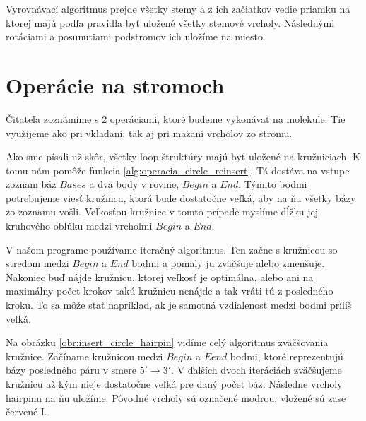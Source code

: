 Vyrovnávací algoritmus prejde všetky stemy a z ich začiatkov vedie priamku na ktorej
majú podľa pravidla byť uložené všetky stemové vrcholy. Následnými rotáciami
a posunutiami podstromov ich uložíme na miesto.




\section{Operácie na stromoch}

Čitateľa zoznámime s 2 operáciami, ktoré budeme vykonávať na molekule. Tie využijeme
ako pri vkladaní, tak aj pri mazaní vrcholov zo stromu.



Ako sme písali už skôr, všetky loop štruktúry majú byť uložené na kružniciach.
K tomu nám pomôže funkcia \ref{alg:operacia_circle_reinsert}.
Tá dostáva na vstupe zoznam báz $Bases$ a dva body v rovine, $Begin$ a $End$.
Týmito bodmi potrebujeme viesť kružnicu, ktorá bude dostatočne veľká, aby
na ňu všetky bázy zo zoznamu vošli. Veľkosťou kružnice v tomto prípade myslíme
dĺžku jej kruhového oblúku medzi vrcholmi $Begin$ a $End$.

V našom programe používame iteračný algoritmus. Ten začne s kružnicou so stredom
medzi $Begin$ a $End$ bodmi a pomaly ju zväčšuje alebo zmenšuje.
Nakoniec buď nájde kružnicu, ktorej veľkosť je optimálna, alebo ani na maximálny
počet krokov takú kružnicu nenájde a tak vráti tú z posledného kroku.
To sa môže stať napríklad, ak je samotná vzdialenosť medzi bodmi príliš veľká.

Na obrázku \ref{obr:insert_circle_hairpin} vidíme celý algoritmus zväčšovania kružnice.
Začíname kružnicou medzi $Begin$ a $Eend$ bodmi, ktoré reprezentujú bázy posledného
páru v smere $5' \to 3'$. V ďalších dvoch iteráciách zväčšujeme kružnicu až kým
nieje dostatočne veľká pre daný počet báz. Následne vrcholy hairpinu
na ňu uložíme.
Pôvodné vrcholy sú označené modrou, vložené sú zase červené I.

\renewcommand{\wi}{0.24\textwidth}

